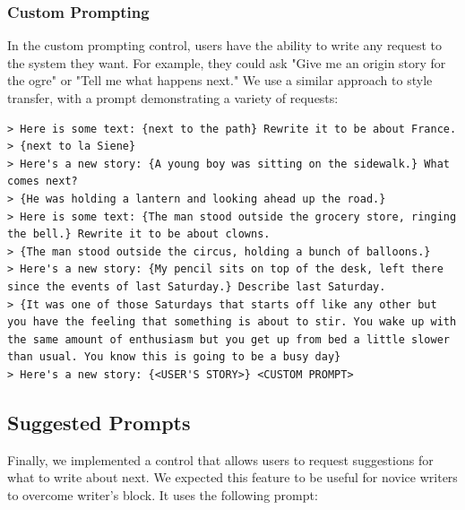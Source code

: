\subsubsection{Custom Prompting}
In the custom prompting control, users have the ability to write any request to the system they want. For example, they could ask "Give me an origin story for the ogre" or "Tell me what happens next." We use a similar approach to style transfer, with a prompt demonstrating a variety of requests:

\begin{verbatim}
> Here is some text: {next to the path} Rewrite it to be about France.
> {next to la Siene}
> Here's a new story: {A young boy was sitting on the sidewalk.} What comes next?
> {He was holding a lantern and looking ahead up the road.‌}
> Here is some text: {The man stood outside the grocery store, ringing the bell.} Rewrite it to be about clowns.
> {The man stood outside the circus, holding a bunch of balloons.}
> Here's a new story: {My pencil sits on top of the desk, left there since ‌the events‌ of last Saturday.} Describe last Saturday.
> {It was one of those Saturdays that starts off like any other but you have the feeling that something is about to stir. You wake up with the same amount of enthusiasm but you get up from bed a little slower than usual. You know this is going to be a busy day}
> Here's a new story: {<USER'S STORY>} <CUSTOM PROMPT>
\end{verbatim}

\subsection {Suggested Prompts}
Finally, we implemented a control that allows users to request suggestions for what to write about next.
We expected this feature to be useful for novice writers to overcome writer's block.
It uses the following prompt:

